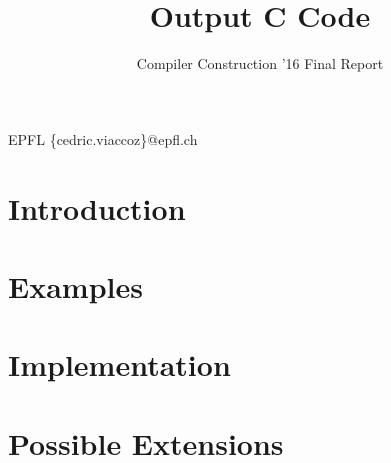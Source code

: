 \documentclass[nocopyrightspace,11pt,authoryear,preprint]{sigplanconf}
\begin{document}


\title{Output C Code}
\subtitle{Compiler Construction '16 Final Report}

           {EPFL}
           {\{cedric.viaccoz\}@epfl.ch}

\maketitle

\section{Introduction}


\section{Examples}


\section{Implementation}


\section{Possible Extensions}




\end{document}
